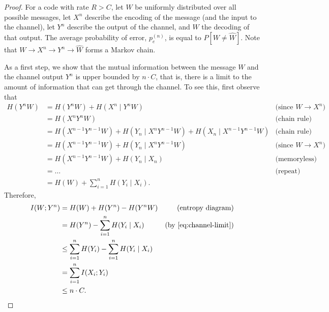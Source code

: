 \begin{proof}
For a code with rate $R > C$, let $W$ be uniformly distributed over all possible messages, let $X^n$ describe the encoding of the message (and the input to the channel), let $Y^n$ describe the output of the channel, and $\hat{W}$ the decoding of that output. The average probability of error, $p_e^{(n)}$, is equal to $P[W \neq \hat{W}]$. Note that $W \to X^n \to Y^n \to \hat{W}$ forms a Markov chain.

As a first step, we show that the mutual information between the message $W$ and the channel output $Y^n$ is upper bounded by $n\cdot C$, that is, there is a limit to the amount of information that can get through the channel. To see this, first observe that
\begin{align}
H(Y^nW) &= H(Y^nW) + H(X^n \mid Y^nW) &\text{(since }W \to X^n\text{)}\nonumber\\
&= H(X^nY^nW) &\text{(chain rule)}\nonumber\\
&= H(X^{n-1}Y^{n-1}W) + H(Y_n \mid X^nY^{n-1}W) + H(X_n \mid X^{n-1}Y^{n-1}W) &\text{(chain rule)}\nonumber\\
&= H(X^{n-1}Y^{n-1}W) + H(Y_n \mid X^nY^{n-1}W)&\text{(since }W \to X^n\text{)}\nonumber\\
&= H(X^{n-1}Y^{n-1}W) + H(Y_n \mid X_n)&\text{(memoryless)}\nonumber\\
&= \dots &\text{(repeat)}\nonumber\\
&= H(W) + \sum_{i=1}^n H(Y_i \mid X_i).\label{eq:channel-limit}
\end{align}
Therefore,
\begin{align}
I(W;Y^n) &= H(W) + H(Y^n) - H(Y^nW) &\text{(entropy diagram)}\nonumber\\
&= H(Y^n) - \sum_{i=1}^n H(Y_i \mid X_i) &\text{(by \eqref{eq:channel-limit})}\nonumber\\
&\leq \sum_{i=1}^n H(Y_i) - \sum_{i=1}^n H(Y_i \mid X_i)\nonumber\\
&= \sum_{i=1}^n I(X_i;Y_i)\nonumber\\
&\leq n \cdot C.
\end{align}
\end{proof}



